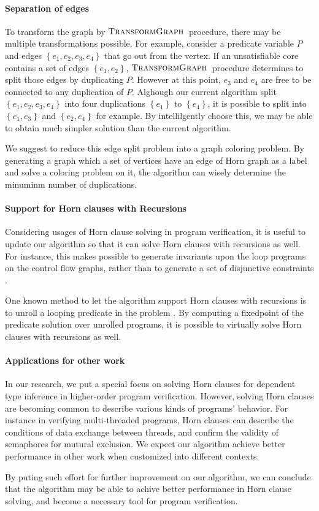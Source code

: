 \paragraph{Separation of edges}
To transform the graph by $\mbox{\sc TransformGraph}$~procedure, there may be
multiple transformations possible.  For example, consider a predicate
variable $P$ and edges $\left\lbrace e_1, e_2, e_3, e_4 \right\rbrace$
that go out from the vertex.  If an unsatisfiable core contains a set
of edges $\left\lbrace e_1, e_2 \right\rbrace$,
$\mbox{\sc TransformGraph}$~procedure determines to split those edges by duplicating
$P$.  However at this point, $e_3$ and $e_4$ are free to be connected
to any duplication of $P$.  Alghough our current algorithm split
$\left\lbrace e_1, e_2, e_3, e_4 \right\rbrace$ into four duplications
$\left\lbrace e_1 \right\rbrace$ to $\left\lbrace e_4 \right\rbrace$,
it is possible to split into $\left\lbrace e_1, e_3\right\rbrace$ and
$\left\lbrace e_2, e_4 \right\rbrace$ for example.  By intellilgently
choose this, we may be able to obtain much simpler solution than the
current algorithm.

We suggest to reduce this edge split problem into a graph coloring
problem.  By generating a graph which a set of vertices have an edge
of Horn graph as a label and solve a coloring problem on it, the
algorithm can wisely determine the minuminm number of duplications.


\paragraph{Support for Horn clauses with Recursions}
Considering usages of Horn clause solving in program verification, it
is useful to update our algorithm so that it can solve Horn clauses
with recursions as well. For instance, this makes possible to generate
invariants upon the loop programs on the control flow graphs, rather
than to generate a set of disjunctive constraints
\cite{conf/pldi/BeyerHMR07}.

One known method to let the algorithm support Horn clauses with
recursions is to unroll a looping predicate in the problem
\cite{conf/ppdp/UnnoK09}.  By computing a fixedpoint of the predicate
solution over unrolled programs, it is possible to virtually solve
Horn clauses with recursions as well.


\paragraph{Applications for other work}
In our research, we put a special focus on solving Horn clauses for
dependent type inference in higher-order program verification.
However, solving Horn clauses are becoming common to describe various
kinds of programs' behavior. For instance in verifying multi-threaded
programs, Horn clauses can describe the conditions of data exchange
between threads, and confirm the validity of semaphores for mutural
exclusion.  We expect our algorithm achieve better performance in
other work when customized into different contexts.

By puting such effort for further improvement on our algorithm, we can
conclude that the algorithm may be able to achive better performance
in Horn clause solving, and become a necessary tool for program
verification.
